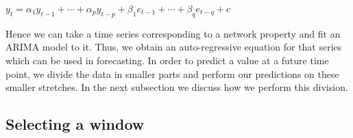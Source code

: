 \begin{center}
 $y_{t}=\alpha_{1}y_{t-1}+\cdots+\alpha_{p}y_{t-p}+\beta_{1}e_{t-1}+\cdots+\beta_{q}e_{t-q}+c$
\end{center}


Hence we can take a time series corresponding to a network property and fit an ARIMA model to it. Thus, we obtain an auto-regressive equation for that series which 
can be used 
in forecasting. 
In order to predict a value at a future time point, we divide the data in smaller parts and perform our predictions on these smaller stretches.
In the next subsection we discuss how we perform this division.

\subsection{Selecting a window}

